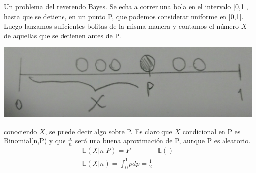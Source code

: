 \documentclass[10pt]{article}
\theoremstyle{plain}
\theoremstyle{definition}
\begin{document}
Un problema del reverendo Bayes. Se echa a correr una bola en el intervalo [0,1], hasta que se detiene, en un punto P, que podemos considerar uniforme en [0,1]. Luego lanzamos suficientes bolitas de la misma manera y contamos el número $X$ de aquellas que se detienen antes de P.
\begin{center}
\includegraphics[scale=0.1]{imagenes/bayesiano1.jpg}
\end{center}
conociendo $X$, se puede decir algo sobre P. Es claro que $X$ condicional en P es Binomial(n,P) y que $\frac{X}{n}$ será una buena aproximación de P, aunque P es aleatorio.
\begin{align*}
\mathbb{E}(X|n|P) = P & \mathbb{E}()\\
\mathbb{E}(X|n) = \int_{0}^{1} p dp = \frac{1}{2}
\end{align*}
\end{document}

